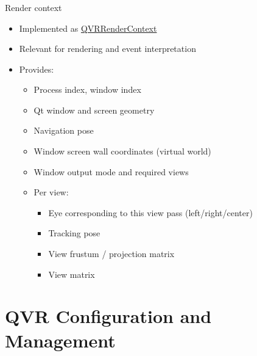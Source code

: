 \documentclass[utf8,stillsansserifmath,fleqn,t]{beamer}
\begin{document}
\begin{frame}
\frametitle{\insertsection}
Render context
\begin{itemize}
\item Implemented as \href{https://marlam.de/qvr/libqvr-reference/class_q_v_r_render_context.html}{QVRRenderContext}
\item Relevant for rendering and event interpretation
\item Provides:
    \begin{itemize}
    \item Process index, window index
    \item Qt window and screen geometry
    \item Navigation pose
    \item Window screen wall coordinates (virtual world)
    \item Window output mode and required views
    \item Per view:
        \begin{itemize}
        \item Eye corresponding to this view pass (left/right/center)
        \item Tracking pose
        \item View frustum / projection matrix
        \item View matrix
        \end{itemize}
    \end{itemize} 
\end{itemize}
\end{frame}

\section{QVR Configuration and Management}
\end{document}
